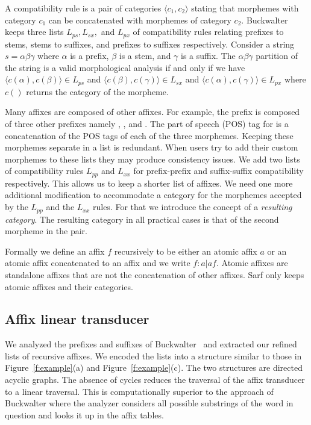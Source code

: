 \documentclass[11pt,letterpaper]{article}
\begin{document}
A compatibility rule is a pair of categories 
$\langle c_1, c_2\rangle$  stating that morphemes
with category $c_1$ can be concatenated with morphemes
of category $c_2$. 
Buckwalter keeps three lists $L_{ps}, L_{sx},$ and $L_{px}$ 
of compatibility rules relating
prefixes to stems, stems to suffixes, and prefixes to suffixes
respectively. 
Consider a string $s=\alpha\beta\gamma$ where $\alpha$ is 
a prefix, $\beta$ is a stem, and $\gamma$ is a suffix. 
The $\alpha\beta\gamma$ partition of the string is a 
valid morphological analysis if  and only if we have
$\langle c(\alpha),c(\beta)\rangle \in L_{ps}$ and
$\langle c(\beta),c(\gamma)\rangle \in L_{sx}$ and
$\langle c(\alpha),c(\gamma)\rangle \in L_{px}$ where
$c()$ returns the category of the morpheme.

Many affixes are composed of other affixes. For example,
the prefix  is composed of three other prefixes
namely , , and .
The part of speech (POS) tag for  is a concatenation
of the POS tags of each of the three morphemes. 
Keeping these morphemes separate in a list
is redundant.
When users try to add their custom morphemes to these
lists they may produce consistency issues. 
We add two lists of compatibility rules $L_{pp}$ and
$L_{xx}$ for prefix-prefix and suffix-suffix compatibility
respectively.
This allows us to keep a shorter list of affixes. 
We need one more additional modification to accommodate 
a category for the morphemes accepted by the $L_{pp}$
and the $L_{xx}$ rules. For that we introduce the concept
of a {\em resulting category}. 
The resulting category in all practical cases
is that of the second morpheme in the pair. 

Formally we define an affix $f$ recursively to be either
an atomic affix $a$ or an atomic affix concatenated
to an affix and we write $f: a | a f$. 
Atomic affixes are standalone affixes
that are not the concatenation of other affixes. 
Sarf only keeps atomic affixes and their categories.

\subsection{Affix linear transducer}
\label{sec:affixFSA}

We analyzed the prefixes and suffixes of 
Buckwalter~
and extracted our refined lists of recursive affixes.
We encoded the lists into a structure similar to those
in Figure~\ref{f:example}(a) and Figure~\ref{f:example}(c).
The two structures are directed acyclic graphs. 
The absence of cycles reduces the 
traversal of the affix transducer to a linear traversal.
This is computationally superior to the 
approach of Buckwalter where the analyzer considers
all possible substrings of the word in question
and looks it up in the affix tables. 
\end{document}
